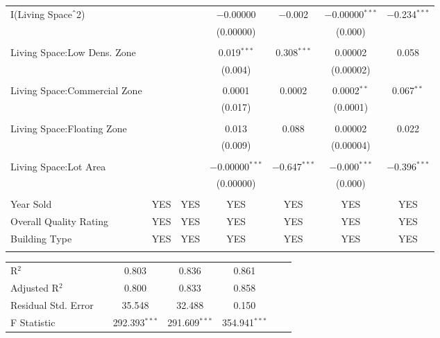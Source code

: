 \documentclass[a4paper]{article}
\begin{document}
\begin{table}[!htbp]
\begin{adjustwidth}{0.cm}{-0cm}
\begin{threeparttable}
\begin{tabular}{@{\extracolsep{-2pt}}lcccccc}
 I(Living Space$\hat{\mkern6mu}$2) &  &  & $-$0.00000 & $-$0.002 & $-$0.00000$^{***}$ & $-$0.234$^{***}$ \\ 
  &  &  & (0.00000) &  & (0.000) &  \\ 
  & & & & & & \\ 
 Living Space:Low Dens. Zone &  &  & 0.019$^{***}$ & 0.308$^{***}$ & 0.00002 & 0.058 \\ 
  &  &  & (0.004) & & (0.00002) &  \\ 
  & & & & & & \\ 
 Living Space:Commercial Zone &  &  & 0.0001 & 0.0002 & 0.0002$^{**}$ & 0.067$^{**}$ \\ 
  &  &  & (0.017) & & (0.0001) & \\ 
  & & & & & & \\ 
 Living Space:Floating Zone &  &  & 0.013 & 0.088 & 0.00002 & 0.022 \\ 
  &  &  & (0.009) &  & (0.00004) & \\ 
  & & & & & & \\ 
 Living Space:Lot Area &  &  & $-$0.00000$^{***}$ & $-$0.647$^{***}$ & $-$0.000$^{***}$ & $-$0.396$^{***}$ \\ 
  &  &  & (0.00000) &  & (0.000) &  \\ 
  & & & & & & \\ 
  Year Sold & YES & YES & YES & YES & YES & YES \\ 
  Overall Quality Rating & YES & YES & YES & YES & YES & YES \\  
  Building Type & YES & YES & YES & YES & YES & YES \\ 
\hline \\[-1.8ex]  
\end{tabular} 
\small 
\centering
\begin{tabular}{@{\extracolsep{39pt}}lcccccc} 
R$^{2}$ && 0.803 &   0.836 &  0.861   \\ 
Adjusted R$^{2}$ && 0.800 &  0.833 &   0.858  \\ 
Residual Std. Error && 35.548  & 32.488  & 0.150   \\ 

F Statistic& & 292.393$^{***}$    & 291.609$^{***}$   & 354.941$^{***}$    \\ 


\end{tabular}
\end{threeparttable}
\end{adjustwidth}
\end{table}
\end{document}
